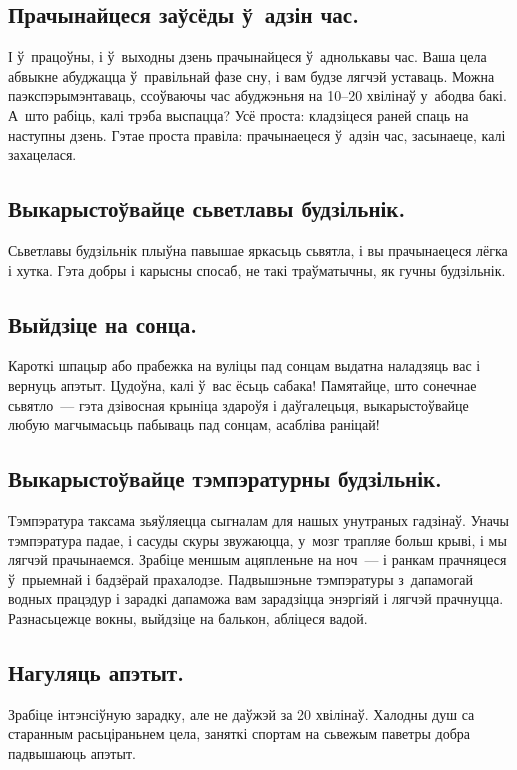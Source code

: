 \subsection{Прачынайцеся заўсёды ў~адзін час.}
І ў~працоўны, і ў~выходны дзень прачынайцеся ў~аднолькавы час. Ваша цела абвыкне абуджацца ў~правільнай фазе сну, і вам будзе лягчэй уставаць. Можна паэкспэрымэнтаваць, ссоўваючы час абуджэньня на 10--20 хвілінаў у~абодва бакі. А~што рабіць, калі трэба выспацца? Усё проста: кладзіцеся раней спаць на наступны дзень. Гэтае проста правіла: прачынаецеся ў~адзін час, засынаеце, калі захацелася.

\subsection{Выкарыстоўвайце сьветлавы будзільнік.}
Сьветлавы будзільнік плыўна павышае яркасьць сьвятла, і вы прачынаецеся лёгка і хутка. Гэта добры і карысны спосаб, не такі траўматычны, як гучны будзільнік.

\subsection{Выйдзіце на сонца.}
Кароткі шпацыр або прабежка на вуліцы пад сонцам выдатна наладзяць вас і вернуць апэтыт. Цудоўна, калі ў~вас ёсьць сабака! Памятайце, што сонечнае сьвятло~--- гэта дзівосная крыніца здароўя і даўгалецьця, выкарыстоўвайце любую магчымасьць пабываць пад сонцам, асабліва раніцай!


\subsection{Выкарыстоўвайце тэмпэратурны будзільнік.}
Тэмпэратура таксама зьяўляецца сыгналам для нашых унутраных гадзінаў. Уначы тэмпэратура падае, і сасуды скуры звужаюцца, у~мозг трапляе больш крыві, і мы лягчэй прачынаемся. Зрабіце меншым ацяпленьне на ноч~--- і ранкам прачняцеся ў~прыемнай і бадзёрай прахалодзе. Падвышэньне тэмпэратуры з~дапамогай водных працэдур і зарадкі дапаможа вам зарадзіцца энэргіяй і лягчэй прачнуцца. Разнасьцежце вокны, выйдзіце на балькон, абліцеся вадой.

\subsection{Нагуляць апэтыт.}
Зрабіце інтэнсіўную зарадку, але не даўжэй за 20 хвілінаў. Халодны душ са старанным расьціраньнем цела, заняткі спортам на сьвежым паветры добра падвышаюць апэтыт.

